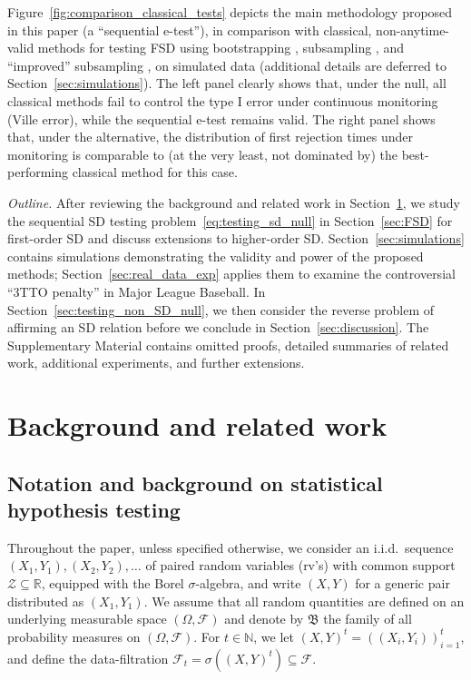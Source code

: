 \documentclass[12pt,twoside]{article}
\theoremstyle{plain}
\theoremstyle{definition}
\theoremstyle{remark}
\newcommand{\N}{\mathbb{N}}
\newcommand{\calF}{\mathcal{F}}
\newcommand{\calZ}{\mathcal{Z}}
\newcommand{\frakB}{\mathfrak{B}}
\begin{document}
Figure~\ref{fig:comparison_classical_tests} depicts the main methodology proposed in this paper (a ``sequential e-test''), in comparison with classical, non-anytime-valid methods for testing FSD using bootstrapping \citep[BD03]{barrett2003consistent}, subsampling \citep[LMW05]{linton2005consistent}, and ``improved'' subsampling \citep[LSW10]{linton2010improved}, on simulated data (additional details are deferred to Section~\ref{sec:simulations}). 
The left panel clearly shows that, under the null, all classical methods fail to control the type I error under continuous monitoring (Ville error), while the sequential e-test remains valid. 
The right panel shows that, under the alternative, the distribution of first rejection times under monitoring is comparable to (at the very least, not dominated by) the best-performing classical method for this case. 

\emph{Outline.}
After reviewing the background and related work in Section~\ref{sec:background_and_related_work}, we study the sequential SD testing problem~\eqref{eq:testing_sd_null} in Section~\ref{sec:FSD} for first-order SD and discuss extensions to higher-order SD.
Section~\ref{sec:simulations} contains simulations demonstrating the validity and power of the proposed methods; Section~\ref{sec:real_data_exp} applies them to examine the controversial ``3TTO penalty'' in Major League Baseball.
In Section~\ref{sec:testing_non_SD_null}, we then consider the reverse problem of affirming an SD relation before we conclude in Section~\ref{sec:discussion}. 
The Supplementary Material contains omitted proofs, detailed summaries of related work, additional experiments, and further extensions. 



\section{Background and related work}\label{sec:background_and_related_work}


\subsection{Notation and background on statistical hypothesis testing}\label{sec:notation}

Throughout the paper, unless specified otherwise, we consider an i.i.d.\ sequence $(X_1,Y_1), (X_2,Y_2), \ldots$ of paired random variables (rv's) with common support $\calZ \subseteq \mathbb{R}$, equipped with the Borel $\sigma$-algebra, and write $(X,Y)$ for a generic pair distributed as $(X_1,Y_1)$. 
We assume that all random quantities are defined on an underlying measurable space $(\Omega,\calF)$ and denote by $\frakB$ the family of all probability measures on $(\Omega,\calF)$. 
For $t\in \N$, we let $(X,Y)^t=((X_i,Y_i))_{i=1}^t$, and define the data-filtration $\calF_t= \sigma((X,Y)^t)\subseteq \calF$.
\end{document}
